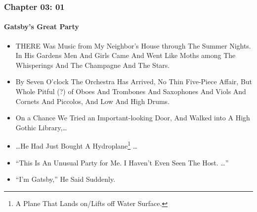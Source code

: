 \begin{frame}
\frametitle{Chapter 03: 01}
\framesubtitle{Gatsby's Great Party}
\label{slide:chapter-03-01}
\begin{itemize}
\item THERE Was Music from My Neighbor's House through The Summer Nights. In His Gardens \alert{Men And Girls Came And Went Like Moths} among The Whisperings And The Champagne And The Stars.
\pause\item By Seven O'clock The Orchestra Has Arrived, No Thin Five-Piece Affair, But Whole Pitful (?) of Oboes And Trombones And Saxophones And Viols And Cornets And Piccolos, And Low And High Drums.
\pause\item On a Chance We Tried \alert{an Important-looking Door}, And Walked into A High Gothic Library,\dots
\pause\item \dots He Had Just Bought A Hydroplane\footnote{A Plane That Lands on/Lifts off Water Surface.} \dots
\pause\item ``This Is An Unusual Party for Me. I Haven't Even Seen The Host. \dots ''
\pause\item ``\alert{I'm Gatsby},'' He Said Suddenly.
\end{itemize}
\end{frame}
